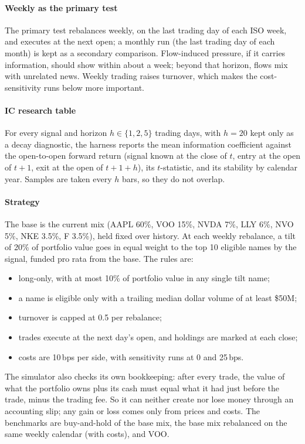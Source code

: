 \documentclass[preprint,3p,twocolumn]{elsarticle}
\begin{document}
\paragraph{Weekly as the primary test} The primary test rebalances weekly, on the last trading day of each ISO week, and executes at the next open; a monthly run (the last trading day of each month) is kept as a secondary comparison. Flow-induced pressure, if it carries information, should show within about a week; beyond that horizon, flows mix with unrelated news. Weekly trading raises turnover, which makes the cost-sensitivity runs below more important.

\paragraph{IC research table} For every signal and horizon $h\in\{1,2,5\}$ trading days, with $h=20$ kept only as a decay diagnostic, the harness reports the mean information coefficient against the open-to-open forward return (signal known at the close of $t$, entry at the open of $t+1$, exit at the open of $t+1+h$), its $t$-statistic, and its stability by calendar year. Samples are taken every $h$ bars, so they do not overlap.

\paragraph{Strategy} The base is the current mix (AAPL 60\%, VOO 15\%, NVDA 7\%, LLY 6\%, NVO 5\%, NKE 3.5\%, F 3.5\%), held fixed over history. At each weekly rebalance, a tilt of 20\% of portfolio value goes in equal weight to the top 10 eligible names by the signal, funded pro rata from the base. The rules are:
\begin{itemize}
\item long-only, with at most 10\% of portfolio value in any single tilt name;
\item a name is eligible only with a trailing median dollar volume of at least \$50M;
\item turnover is capped at 0.5 per rebalance;
\item trades execute at the next day's open, and holdings are marked at each close;
\item costs are 10\,bps per side, with sensitivity runs at 0 and 25\,bps.
\end{itemize}
The simulator also checks its own bookkeeping: after every trade, the value of what the portfolio owns plus its cash must equal what it had just before the trade, minus the trading fee. So it can neither create nor lose money through an accounting slip; any gain or loss comes only from prices and costs. The benchmarks are buy-and-hold of the base mix, the base mix rebalanced on the same weekly calendar (with costs), and VOO.
\end{document}
